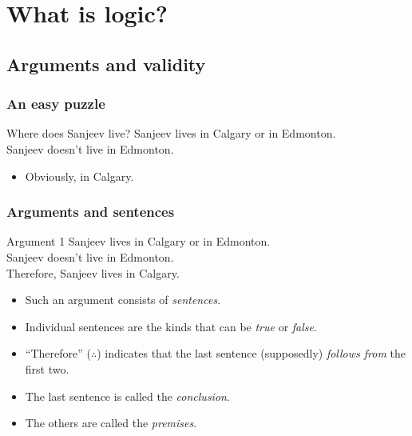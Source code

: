 
\setcounter{section}{0}
\section{What is logic?}
\subsection{Arguments and validity}

\begin{frame}
  \frametitle{An easy puzzle}

  \begin{block}{Where does Sanjeev live?}
  Sanjeev lives in Calgary or in Edmonton.\\
  Sanjeev doesn't live in Edmonton.
  \end{block}

  \begin{itemize}
    \item<2>[A:] Obviously, in Calgary.
  \end{itemize}

\end{frame}

\begin{frame}
  \frametitle{Arguments and sentences}

  \begin{block}{Argument 1}
  Sanjeev lives in Calgary or in Edmonton.\\
  Sanjeev doesn't live in Edmonton.\\
  Therefore, Sanjeev lives in Calgary.
  \end{block}

  \begin{itemize}[<+->]
  \item Such an argument consists of \emph{sentences}.
  \item Individual sentences are the kinds that can be \emph{true} or \emph{false}.
  \item ``Therefore'' ($\therefore$) indicates that the last sentence (supposedly)
  \emph{follows from} the first two.
  \item The last sentence is called the \emph{conclusion}.
  \item The others are called the \emph{premises}.
  \end{itemize}

\end{frame}

